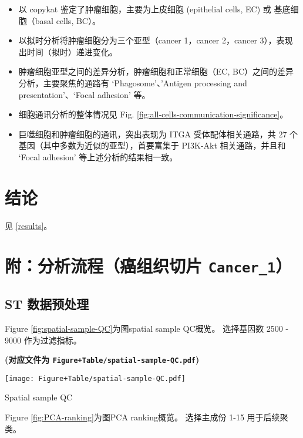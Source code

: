 \documentclass[
]{article}
\providecommand{\tightlist}{%
  \setlength{\itemsep}{0pt}\setlength{\parskip}{0pt}}
\begin{document}
\begin{itemize}
\tightlist
\item
  以 copykat 鉴定了肿瘤细胞，主要为上皮细胞 (epithelial cells, EC) 或 基底细胞（basal cells, BC）。
\item
  以拟时分析将肿瘤细胞分为三个亚型（cancer 1，cancer 2，cancer 3），表现出时间（拟时）递进变化。
\item
  肿瘤细胞亚型之间的差异分析，肿瘤细胞和正常细胞（EC, BC）之间的差异分析，主要聚焦的通路有 `Phagosome'、'Antigen processing and presentation'、`Focal adhesion' 等。
\item
  细胞通讯分析的整体情况见 Fig. \ref{fig:all-cells-communication-significance}。
\item
  巨噬细胞和肿瘤细胞的通讯，突出表现为 ITGA 受体配体相关通路，共 27 个基因（其中多数为近似的亚型），首要富集于 PI3K-Akt 相关通路，并且和 `Focal adhesion' 等上述分析的结果相一致。
\end{itemize}

\hypertarget{dis}{%
\section{结论}\label{dis}}

见 \ref{results}。

\hypertarget{workflow1}{%
\section{\texorpdfstring{附：分析流程（癌组织切片 \texttt{Cancer\_1}）}{附：分析流程（癌组织切片 Cancer\_1）}}\label{workflow1}}

\hypertarget{st-ux6570ux636eux9884ux5904ux7406}{%
\subsection{ST 数据预处理}\label{st-ux6570ux636eux9884ux5904ux7406}}

Figure \ref{fig:spatial-sample-QC}为图spatial sample QC概览。
选择基因数 2500 - 9000 作为过滤指标。

\textbf{(对应文件为 \texttt{Figure+Table/spatial-sample-QC.pdf})}

\def\@captype{figure}
\begin{center}
\texttt{[image: Figure+Table/spatial-sample-QC.pdf]}
\caption{Spatial sample QC}\label{fig:spatial-sample-QC}
\end{center}

Figure \ref{fig:PCA-ranking}为图PCA ranking概览。
选择主成份 1-15 用于后续聚类。
\end{document}
